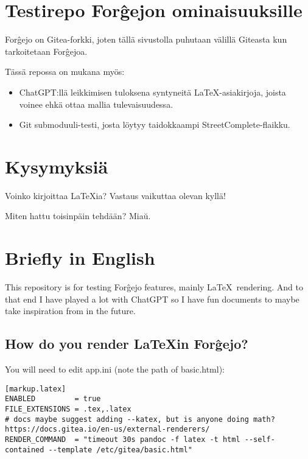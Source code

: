 \documentclass[a4paper,colorlinks,linkcolor=blue]{artikel3}
\begin{document}
\hypersetup{urlcolor=blue}

\section*{Testirepo For\^gejon ominaisuuksille}

For\^gejo on Gitea-forkki, joten tällä sivustolla puhutaan välillä Giteasta kun tarkoitetaan For\^gejoa.

Tässä repossa on mukana myös:


\begin{itemize}
    \item ChatGPT:llä leikkimisen tuloksena syntyneitä \LaTeX -asiakirjoja, joista voinee ehkä ottaa mallia tulevaisuudessa.
    \item Git submoduuli-testi, josta löytyy taidokkaampi StreetComplete-flaikku.
\end{itemize}

\section*{Kysymyksiä}
Voinko kirjoittaa \LaTeX ia?
Vastaus vaikuttaa olevan kyllä!

Miten hattu toisinpäin tehdään?
Mia\u{u}.


\section*{Briefly in English}

This repository is for testing For\^gejo features, mainly \LaTeX\ rendering.
And to that end I have played a lot with ChatGPT so I have fun documents to maybe take inspiration from in the future.

\subsection*{How do you render \LaTeX in For\^gejo?}

You will need to edit app.ini (note the path of basic.html):

\begin{verbatim}
[markup.latex]
ENABLED         = true
FILE_EXTENSIONS = .tex,.latex
# docs maybe suggest adding --katex, but is anyone doing math? https://docs.gitea.io/en-us/external-renderers/
RENDER_COMMAND  = "timeout 30s pandoc -f latex -t html --self-contained --template /etc/gitea/basic.html"
\end{verbatim}
\end{document}
